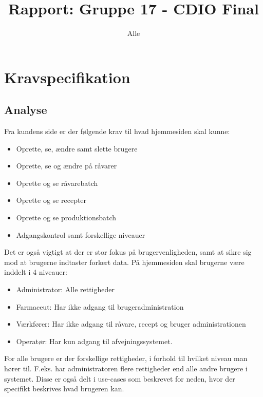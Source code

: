 \documentclass[a4paper]{article}
\title{Rapport: Gruppe 17 - CDIO Final}
\author{
  Alle
}
\begin{document}
\maketitle

\tableofcontents
\clearpage

\section{Kravspecifikation} %

\subsection{Analyse} %
Fra kundens side er der følgende krav til hvad hjemmesiden skal kunne:

\begin{itemize}
  \item Oprette, se, ændre samt slette brugere
  \item Oprette, se og ændre på råvarer
  \item Oprette og se råvarebatch 
  \item Oprette og se recepter
  \item Oprette og se produktionsbatch
  \item Adgangskontrol samt forskellige niveauer
\end{itemize}

Det er også vigtigt at der er stor fokus på brugervenligheden, samt at sikre sig mod at brugerne indtaster forkert data. På hjemmesiden skal brugerne være inddelt i 4 niveauer:

\begin{itemize}
  \item Administrator: Alle rettigheder
  \item Farmaceut: Har ikke adgang til brugeradministration
  \item Værkfører: Har ikke adgang til råvare, recept og bruger administrationen 
  \item Operatør: Har kun adgang til afvejningssystemet. 
\end{itemize}

For alle brugere er der forskellige rettigheder, i forhold til hvilket niveau man hører til. F.eks. har administratoren flere rettigheder end alle andre brugere i systemet. Disse er også delt i use-cases som beskrevet for neden, hvor der specifikt beskrives hvad brugeren kan. 

\end{document}
